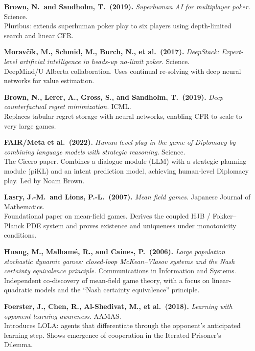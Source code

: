 \documentclass[11pt,a4paper]{article}
\theoremstyle{plain}
\theoremstyle{definition}
\begin{document}
\begin{enumerate}[label={[\arabic*]}, leftmargin=*, itemsep=6pt]
\item \textbf{Brown, N.\ and Sandholm, T.\ (2019).}  \emph{Superhuman AI
  for multiplayer poker.}  Science.\\
  Pluribus: extends superhuman poker play to six players using
  depth-limited search and linear CFR.

\item \textbf{Moravčík, M., Schmid, M., Burch, N., et al.\ (2017).}
  \emph{DeepStack: Expert-level artificial intelligence in heads-up
  no-limit poker.}  Science.\\
  DeepMind/U Alberta collaboration.  Uses continual re-solving with deep
  neural networks for value estimation.

\item \textbf{Brown, N., Lerer, A., Gross, S., and Sandholm, T.\ (2019).}
  \emph{Deep counterfactual regret minimization.}  ICML.\\
  Replaces tabular regret storage with neural networks, enabling CFR to
  scale to very large games.

\item \textbf{FAIR/Meta et al.\ (2022).}  \emph{Human-level play in the
  game of Diplomacy by combining language models with strategic
  reasoning.}  Science.\\
  The Cicero paper.  Combines a dialogue module (LLM) with a strategic
  planning module (piKL) and an intent prediction model, achieving
  human-level Diplomacy play.  Led by Noam Brown.

\item \textbf{Lasry, J.-M.\ and Lions, P.-L.\ (2007).}  \emph{Mean field
  games.}  Japanese Journal of Mathematics.\\
  Foundational paper on mean-field games.  Derives the coupled HJB /
  Fokker--Planck PDE system and proves existence and uniqueness under
  monotonicity conditions.

\item \textbf{Huang, M., Malham\'e, R., and Caines, P.\ (2006).}
  \emph{Large population stochastic dynamic games: closed-loop
  McKean--Vlasov systems and the Nash certainty equivalence principle.}
  Communications in Information and Systems.\\
  Independent co-discovery of mean-field game theory, with a focus on
  linear-quadratic models and the ``Nash certainty equivalence''
  principle.

\item \textbf{Foerster, J., Chen, R., Al-Shedivat, M., et al.\ (2018).}
  \emph{Learning with opponent-learning awareness.}  AAMAS.\\
  Introduces LOLA: agents that differentiate through the opponent's
  anticipated learning step.  Shows emergence of cooperation in the
  Iterated Prisoner's Dilemma.


\end{enumerate}
\end{document}
